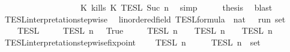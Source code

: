 \begin{isabellebody}
\ \ \ \ \ \ \ \ \ \ \ \ \ \ \ \ \ {\isasyminter}\ {\isasymlbrakk}\ K\ kills\ K\ {\isasymrbrakk}\isactrlsub T\isactrlsub E\isactrlsub S\isactrlsub L\isactrlbsup {\isasymge}\ Suc\ n\isactrlesup {\isacartoucheclose}\ \isamarkupfalse%
\ simp\isanewline
\ \ \isamarkupfalse%
\ \isamarkupfalse%
\ {\isacharquery}thesis\ \isamarkupfalse%
\ blast\isanewline
{}\isamarkupfalse%
%
\endisatagproof
{\isafoldproof}%
%
\isadelimproof
\isanewline
%
\endisadelimproof
\isanewline
{}\isamarkupfalse%
\ TESL{\isacharunderscore}interpretation{\isacharunderscore}stepwise\isanewline
\ \ {\isacharcolon}{\isacharcolon}{\isacartoucheopen}{\isacharprime}{\isasymtau}{\isacharcolon}{\isacharcolon}linordered{\isacharunderscore}field\ TESL{\isacharunderscore}formula\ {\isasymRightarrow}\ nat\ {\isasymRightarrow}\ {\isacharprime}{\isasymtau}\ run\ set{\isacartoucheclose}\isanewline
\ \ {\isacharparenleft}{\isachardoublequoteopen}{\isasymlbrakk}{\isasymlbrakk}\ {\isacharunderscore}\ {\isasymrbrakk}{\isasymrbrakk}\isactrlsub T\isactrlsub E\isactrlsub S\isactrlsub L\isactrlbsup {\isasymge}\ {\isacharunderscore}\isactrlesup {\isachardoublequoteclose}{\isacharparenright}\isanewline
{}\isanewline
\ \ {\isacartoucheopen}{\isasymlbrakk}{\isasymlbrakk}\ {\isacharbrackleft}{\isacharbrackright}\ {\isasymrbrakk}{\isasymrbrakk}\isactrlsub T\isactrlsub E\isactrlsub S\isactrlsub L\isactrlbsup {\isasymge}\ n\isactrlesup \ {\isacharequal}\ {\isacharbraceleft}{\isasymrho}{\isachardot}\ True{\isacharbraceright}{\isacartoucheclose}\isanewline
{\isacharbar}\ {\isacartoucheopen}{\isasymlbrakk}{\isasymlbrakk}\ {\isasymphi}\ {\isacharhash}\ {\isasymPhi}\ {\isasymrbrakk}{\isasymrbrakk}\isactrlsub T\isactrlsub E\isactrlsub S\isactrlsub L\isactrlbsup {\isasymge}\ n\isactrlesup \ {\isacharequal}\ {\isasymlbrakk}\ {\isasymphi}\ {\isasymrbrakk}\isactrlsub T\isactrlsub E\isactrlsub S\isactrlsub L\isactrlbsup {\isasymge}\ n\isactrlesup \ {\isasyminter}\ {\isasymlbrakk}{\isasymlbrakk}\ {\isasymPhi}\ {\isasymrbrakk}{\isasymrbrakk}\isactrlsub T\isactrlsub E\isactrlsub S\isactrlsub L\isactrlbsup {\isasymge}\ n\isactrlesup {\isacartoucheclose}\isanewline
\isanewline
{}\isamarkupfalse%
\ TESL{\isacharunderscore}interpretation{\isacharunderscore}stepwise{\isacharunderscore}fixpoint{\isacharcolon}\isanewline
\ \ {\isacartoucheopen}{\isasymlbrakk}{\isasymlbrakk}\ {\isasymPhi}\ {\isasymrbrakk}{\isasymrbrakk}\isactrlsub T\isactrlsub E\isactrlsub S\isactrlsub L\isactrlbsup {\isasymge}\ n\isactrlesup \ {\isacharequal}\ {\isasymInter}\ {\isacharparenleft}{\isacharparenleft}{\isasymlambda}{\isasymphi}{\isachardot}\ {\isasymlbrakk}\ {\isasymphi}\ {\isasymrbrakk}\isactrlsub T\isactrlsub E\isactrlsub S\isactrlsub L\isactrlbsup {\isasymge}\ n\isactrlesup {\isacharparenright}\ {\isacharbackquote}\ set\ {\isasymPhi}{\isacharparenright}{\isacartoucheclose}\isanewline

\end{isabellebody}
